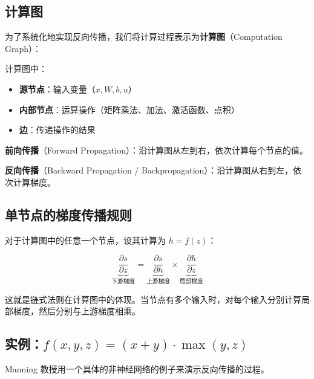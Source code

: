 \documentclass[a4paper]{article}
\begin{document}
\subsection{计算图}

为了系统化地实现反向传播，我们将计算过程表示为\textbf{计算图}（Computation Graph）：





计算图中：
\begin{itemize}
    \item \textbf{源节点}：输入变量（$x, W, b, u$）
    \item \textbf{内部节点}：运算操作（矩阵乘法、加法、激活函数、点积）
    \item \textbf{边}：传递操作的结果
\end{itemize}

\textbf{前向传播}（Forward Propagation）：沿计算图从左到右，依次计算每个节点的值。

\textbf{反向传播}（Backward Propagation / Backpropagation）：沿计算图从右到左，依次计算梯度。





\subsection{单节点的梯度传播规则}

对于计算图中的任意一个节点，设其计算为 $h = f(z)$：





$$\underbrace{\frac{\partial s}{\partial z}}_{\text{下游梯度}} = \underbrace{\frac{\partial s}{\partial h}}_{\text{上游梯度}} \times \underbrace{\frac{\partial h}{\partial z}}_{\text{局部梯度}}$$

这就是链式法则在计算图中的体现。当节点有多个输入时，对每个输入分别计算局部梯度，然后分别与上游梯度相乘。

\subsection{实例：$f(x,y,z) = (x+y) \cdot \max(y,z)$}

Manning 教授用一个具体的非神经网络的例子来演示反向传播的过程。


\end{document}
